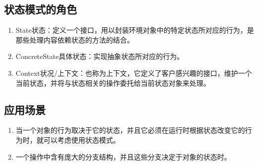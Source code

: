 \subsection{状态模式的角色}
\begin{enumerate}
	\item State状态：定义一个接口，用以封装环境对象中的特定状态所对应的行为，是那些处理内容依赖状态的方法的结合。
	\item ConcreteState具体状态：实现抽象状态所对应的行为。
	\item Context状况/上下文：也称为上下文，它定义了客户感兴趣的接口，维护一个当前状态，并将与状态相关的操作委托给当前状态对象来处理。
\end{enumerate}
\subsection{应用场景}
\begin{enumerate}
	\item 当一个对象的行为取决于它的状态，并且它必须在运行时根据状态改变它的行为时，就可以考虑使用状态模式。
	\item 一个操作中含有庞大的分支结构，并且这些分支决定于对象的状态时。
\end{enumerate}
